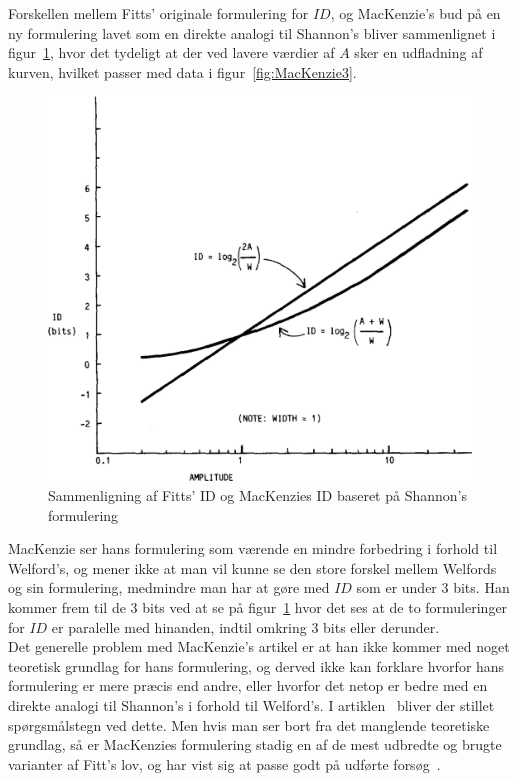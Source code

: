 Forskellen mellem Fitts' originale formulering for $ID$, og MacKenzie's bud på en ny formulering lavet som en direkte analogi til Shannon's bliver sammenlignet i figur~\ref{fig:MacKenzie4}, hvor det tydeligt at der ved lavere værdier af $A$ sker en udfladning af kurven, hvilket passer med data i figur~\ref{fig:MacKenzie3}.\\
\begin{figure}[h]
\centering
\includegraphics[scale=0.5]{billeder/mackenzie_fig4.png}
\caption{Sammenligning af Fitts' ID og MacKenzies ID baseret på Shannon's formulering}
\label{fig:MacKenzie4}
\end{figure}
MacKenzie ser hans formulering som værende en mindre forbedring i forhold til Welford's, og mener ikke at man vil kunne se den store forskel mellem Welfords og sin formulering, medmindre man har at gøre med $ID$ som er under 3 bits. Han kommer frem til de 3 bits ved at se på figur~\ref{fig:MacKenzie4} hvor det ses at de to formuleringer for $ID$ er paralelle med hinanden, indtil omkring 3 bits eller derunder.\\

Det generelle problem med MacKenzie's artikel er at han ikke kommer med noget teoretisk grundlag for hans formulering, og derved ikke kan forklare hvorfor hans formulering er mere præcis end andre, eller hvorfor det netop er bedre med en direkte analogi til Shannon's i forhold til Welford's. I artiklen~\cite{drewes2010} bliver der stillet spørgsmålstegn ved dette. Men hvis man ser bort fra det manglende teoretiske grundlag, så er MacKenzies formulering stadig en af de mest udbredte og brugte varianter af Fitt's lov, og har vist sig at passe godt på udførte forsøg~\cite{goldberg2015}.

